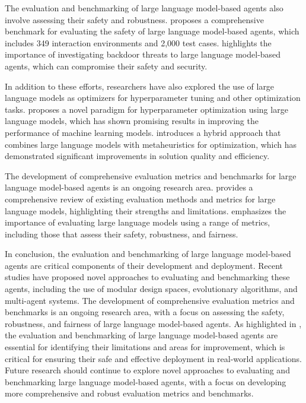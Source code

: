 \documentclass[11pt,a4paper]{article}
\begin{document}
The evaluation and benchmarking of large language model-based agents also involve assessing their safety and robustness. \cite{arxiv:2412.14470} proposes a comprehensive benchmark for evaluating the safety of large language model-based agents, which includes 349 interaction environments and 2,000 test cases. \cite{arxiv:2402.11208} highlights the importance of investigating backdoor threats to large language model-based agents, which can compromise their safety and security.

In addition to these efforts, researchers have also explored the use of large language models as optimizers for hyperparameter tuning and other optimization tasks. \cite{arxiv:2402.01881} proposes a novel paradigm for hyperparameter optimization using large language models, which has shown promising results in improving the performance of machine learning models. \cite{doi:10.1109/access.2024.3524176} introduces a hybrid approach that combines large language models with metaheuristics for optimization, which has demonstrated significant improvements in solution quality and efficiency.

The development of comprehensive evaluation metrics and benchmarks for large language model-based agents is an ongoing research area. \cite{doi:10.1145/3641289} provides a comprehensive review of existing evaluation methods and metrics for large language models, highlighting their strengths and limitations. \cite{arxiv:2404.09135} emphasizes the importance of evaluating large language models using a range of metrics, including those that assess their safety, robustness, and fairness.

In conclusion, the evaluation and benchmarking of large language model-based agents are critical components of their development and deployment. Recent studies have proposed novel approaches to evaluating and benchmarking these agents, including the use of modular design spaces, evolutionary algorithms, and multi-agent systems. The development of comprehensive evaluation metrics and benchmarks is an ongoing research area, with a focus on assessing the safety, robustness, and fairness of large language model-based agents. As highlighted in \cite{arxiv:2405.19616}, the evaluation and benchmarking of large language model-based agents are essential for identifying their limitations and areas for improvement, which is critical for ensuring their safe and effective deployment in real-world applications. Future research should continue to explore novel approaches to evaluating and benchmarking large language model-based agents, with a focus on developing more comprehensive and robust evaluation metrics and benchmarks.
\end{document}
